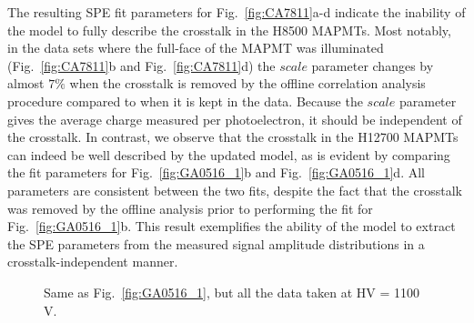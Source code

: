 The resulting SPE fit parameters for Fig.~\ref{fig:CA7811}a-d indicate the inability of the model to fully describe the crosstalk in the H8500 MAPMTs. 
Most notably, in the data sets where the full-face of the MAPMT was illuminated (Fig.~\ref{fig:CA7811}b and Fig.~\ref{fig:CA7811}d) the $scale$ parameter changes by almost $7\%$ when the crosstalk is removed by the offline correlation analysis procedure compared to when it is kept in the data. 
Because the $scale$ parameter gives the average charge measured per photoelectron, it should be independent of the crosstalk. 
In contrast, we observe that the crosstalk in the H12700 MAPMTs can indeed be well described by the updated model, as is evident by comparing the fit parameters for Fig.~\ref{fig:GA0516_1}b and Fig.~\ref{fig:GA0516_1}d. 
All parameters are consistent between the two fits, despite the fact that the crosstalk was removed by the offline analysis prior to performing the fit for Fig.~\ref{fig:GA0516_1}b. 
This result exemplifies the ability of the model to extract the SPE parameters from the measured signal amplitude distributions in a crosstalk-independent manner. 

\begin{figure}[h!bt] 
\centering 
  \caption{Same as Fig.~\ref{fig:GA0516_1}, but all the data taken at HV = 1100 V. 
    }
\label{fig:GA0516_2}
\end{figure}

